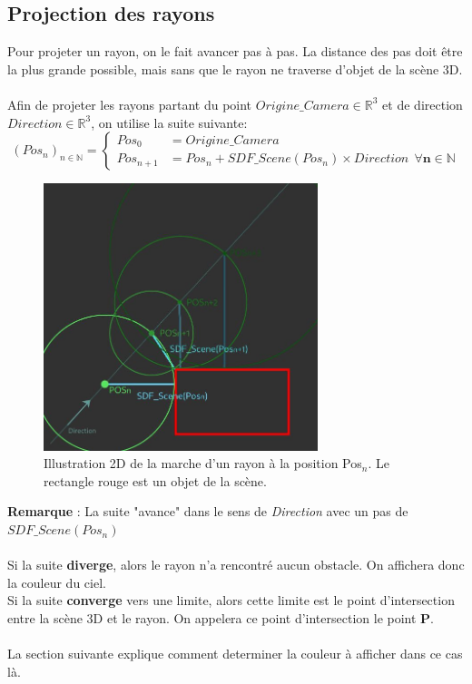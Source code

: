\newpage
\subsection{Projection des rayons}
\label{subsec:projection}
Pour projeter un rayon, on le fait avancer pas à pas. La distance des pas doit être la plus grande possible, mais sans que le rayon ne traverse d'objet de la scène 3D.\\
\\
Afin de projeter les rayons partant du point $Origine\_Camera\in \mathbb{R}^3$ et de direction $Direction\in \mathbb{R}^3$, on utilise la suite suivante:
$$
(Pos_n)_{n\in \mathbb{N}}=\left\{
    \begin{array}{ll}
        Pos_0 &= Origine\_Camera \\
        Pos_{n+1} &= Pos_n + SDF\_Scene(Pos_n)\times Direction \ \ \mathbf{\forall n\in \mathbb{N}}
    \end{array}
\right.
$$

\begin{figure}[h]
    \centering
    \includegraphics[width=8cm]{images/ProjectionDesRayons.jpg}
    \caption{Illustration 2D de la marche d'un rayon à la position Pos$_n$. Le rectangle rouge est un objet de la scène.}
    \label{fig:projectionrayons}
\end{figure}

\textbf{Remarque} : La suite "avance" dans le sens de \emph{Direction} avec un pas de $SDF\_Scene(Pos_n)$\\
\\
Si la suite \textbf{diverge}, alors le rayon n'a rencontré aucun obstacle. On affichera donc la couleur du ciel.\\
Si la suite \textbf{converge} vers une limite, alors cette limite est le point d'intersection entre la scène 3D et le rayon. On appelera ce point d'intersection le point \textbf{P}.\\
\\
La section suivante explique comment determiner la couleur à afficher dans ce cas là.
